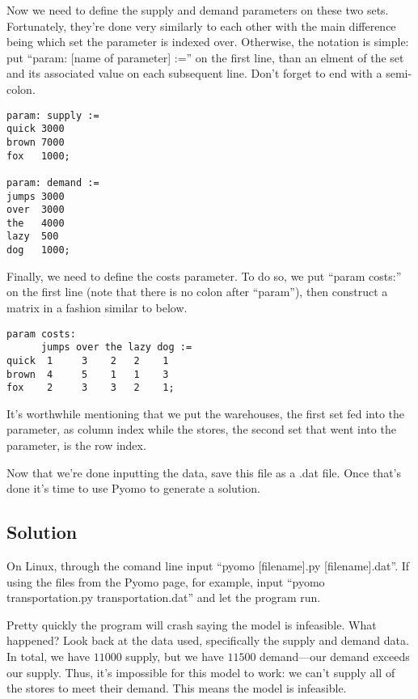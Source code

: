 \documentclass{article}
\begin{document}
Now we need to define the supply and demand parameters on these two sets.  Fortunately, they're done very similarly to each other with the main difference being which set the parameter is indexed over.  Otherwise, the notation is simple: put ``param: [name of parameter] :='' on the first line, than an elment of the set and its associated value on each subsequent line.  Don't forget to end with a semi-colon.

\begin{verbatim}
param: supply :=
quick 3000
brown 7000
fox   1000;

param: demand :=
jumps 3000
over  3000
the   4000
lazy  500
dog   1000;
\end{verbatim}

Finally, we need to define the costs parameter.  To do so, we put ``param costs:'' on the first line (note that there is no colon after ``param''), then construct a matrix in a fashion similar to below.

\begin{verbatim}
param costs:
      jumps over the lazy dog :=
quick  1     3    2   2    1
brown  4     5    1   1    3
fox    2     3    3   2    1;
\end{verbatim}

\noindent
It's worthwhile mentioning that we put the warehouses, the first set fed into the parameter, as column index while the stores, the second set that went into the parameter, is the row index.

Now that we're done inputting the data, save this file as a .dat file.  Once that's done it's time to use Pyomo to generate a solution.

\subsection*{Solution}

On Linux, through the comand line input ``pyomo [filename].py [filename].dat''.  If using the files from the Pyomo page, for example, input ``pyomo transportation.py transportation.dat'' and let the program run.

Pretty quickly the program will crash saying the model is infeasible.  What happened?  Look back at the data used, specifically the supply and demand data.  In total, we have $11000$ supply, but we have $11500$ demand---our demand exceeds our supply.  Thus, it's impossible for this model to work: we can't supply all of the stores to meet their demand.  This means the model is infeasible.
\end{document}
